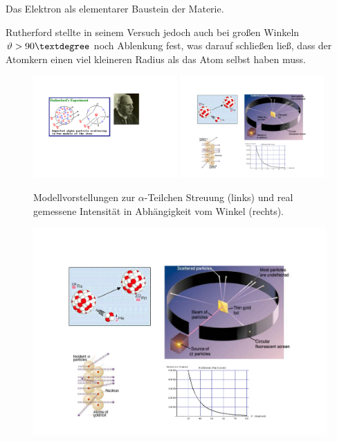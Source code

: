 	{}
	{Das Elektron als elementarer Baustein der Materie.}

Rutherford stellte in seinem Versuch jedoch auch bei großen Winkeln $\th>90°$
noch Ablenkung fest, was darauf schließen ließ, dass der Atomkern
einen viel kleineren Radius als das Atom selbst haben muss.

\begin{figure}[!htbp]
	\centering
	\includegraphics[width=0.49\textwidth]{fig/2-RutherfordStreuungErwartung.pdf}
	\includegraphics[width=0.49\textwidth]{fig/2-RutherfordExperimentWinkelabhaengigkeit.pdf}
	\caption{Modellvorstellungen zur $\alpha$-Teilchen Streuung (links) und real
	gemessene Intensität in Abhängigkeit vom Winkel (rechts).}
\end{figure}

\begin{figure}[!htbp]
	\centering
	\includegraphics[width=\textwidth]{fig/2-RutherfordExperimentAufbau.pdf}
\end{figure}

